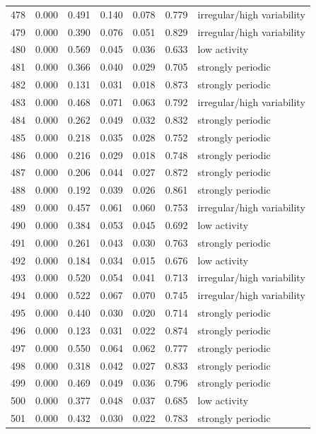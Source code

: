 \begin{longtable}{lrrrrrl}
478 & 0.000 & 0.491 & 0.140 & 0.078 & 0.779 & irregular/high variability \\
479 & 0.000 & 0.390 & 0.076 & 0.051 & 0.829 & irregular/high variability \\
480 & 0.000 & 0.569 & 0.045 & 0.036 & 0.633 & low activity \\
481 & 0.000 & 0.366 & 0.040 & 0.029 & 0.705 & strongly periodic \\
482 & 0.000 & 0.131 & 0.031 & 0.018 & 0.873 & strongly periodic \\
483 & 0.000 & 0.468 & 0.071 & 0.063 & 0.792 & irregular/high variability \\
484 & 0.000 & 0.262 & 0.049 & 0.032 & 0.832 & strongly periodic \\
485 & 0.000 & 0.218 & 0.035 & 0.028 & 0.752 & strongly periodic \\
486 & 0.000 & 0.216 & 0.029 & 0.018 & 0.748 & strongly periodic \\
487 & 0.000 & 0.206 & 0.044 & 0.027 & 0.872 & strongly periodic \\
488 & 0.000 & 0.192 & 0.039 & 0.026 & 0.861 & strongly periodic \\
489 & 0.000 & 0.457 & 0.061 & 0.060 & 0.753 & irregular/high variability \\
490 & 0.000 & 0.384 & 0.053 & 0.045 & 0.692 & low activity \\
491 & 0.000 & 0.261 & 0.043 & 0.030 & 0.763 & strongly periodic \\
492 & 0.000 & 0.184 & 0.034 & 0.015 & 0.676 & low activity \\
493 & 0.000 & 0.520 & 0.054 & 0.041 & 0.713 & irregular/high variability \\
494 & 0.000 & 0.522 & 0.067 & 0.070 & 0.745 & irregular/high variability \\
495 & 0.000 & 0.440 & 0.030 & 0.020 & 0.714 & strongly periodic \\
496 & 0.000 & 0.123 & 0.031 & 0.022 & 0.874 & strongly periodic \\
497 & 0.000 & 0.550 & 0.064 & 0.062 & 0.777 & strongly periodic \\
498 & 0.000 & 0.318 & 0.042 & 0.027 & 0.833 & strongly periodic \\
499 & 0.000 & 0.469 & 0.049 & 0.036 & 0.796 & strongly periodic \\
500 & 0.000 & 0.377 & 0.048 & 0.037 & 0.685 & low activity \\
501 & 0.000 & 0.432 & 0.030 & 0.022 & 0.783 & strongly periodic \\

\end{longtable}
